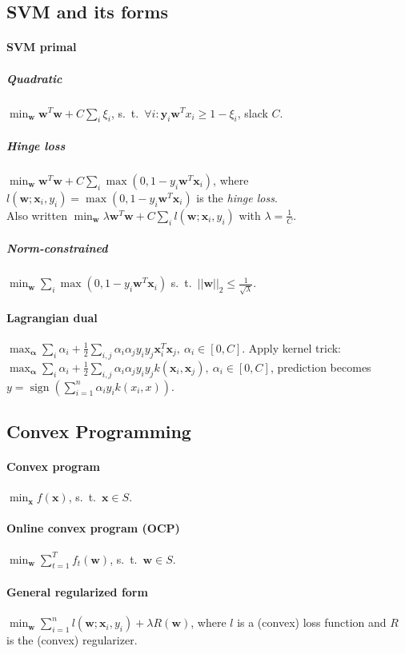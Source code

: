 \documentclass[a4paper, 9pt, DIV=24]{scrartcl}
\DeclareMathOperator{\sign}{sign}
\begin{document}
\begin{twocolumn}
\subsection{SVM and its forms}
\paragraph{SVM primal}
\subparagraph{Quadratic} $\min_{\bm w} \bm w^T \bm w + C\sum_{i}\xi_i$,
s.\ t.\ $\forall i: \bm y_i\bm w^T x_i \geq 1 - \xi_i$, slack $C$.
\subparagraph{Hinge loss} $\min_{\bm w} \bm w^T \bm w + C\sum_{i}\max(0,1-y_i\bm w^T\bm x_i)$,\newline
where $l(\bm w; \bm x_i, y_i) = \max(0,1-y_i\bm w^T \bm x_i)$ is the \emph{hinge loss}. \\
Also written $\min_{\bm w} \lambda \bm w^T \bm w + C\sum_{i}l(\bm w; \bm x_i, y_i)$ with $\lambda = \frac{1}{C}$.
\subparagraph{Norm-constrained}
$\min_{\bm w} \sum_{i}\max(0,1-y_i\bm w^T\bm x_i)$ s.\ t.\ $||\bm w||_2 \leq \frac{1}{\sqrt \lambda}$.
\paragraph{Lagrangian dual}
$\max_{\bm \alpha} \sum_{i}\alpha_i + \frac{1}{2}\sum_{i,j}\alpha_i\alpha_j y_i y_j \bm x_i^T\bm x_j,\ \alpha_i \in [0,C]$.
Apply kernel trick: 
$\max_{\bm \alpha} \sum_{i}\alpha_i + \frac{1}{2}\sum_{i,j}\alpha_i\alpha_j y_i y_j k(\bm x_i, \bm x_j),\ \alpha_i \in [0,C]$, prediction becomes $y = \sign(\sum_{i=1}^{n}\alpha_i y_i k(x_i,x))$.

\subsection{Convex Programming}
\paragraph{Convex program} $\min_{\bm x} f(\bm x)$, s.\ t.\ $\bm x \in S$.
\paragraph{Online convex program (OCP)} $\min_{\bm w} \sum_{t=1}^{T} f_t(\bm w)$, s.\ t.\ $\bm w \in S$.
\paragraph{General regularized form} $\min_{\bm w} \sum_{i=1}^{n} l(\bm w; \bm x_i, y_i) + \lambda R(\bm w)$, where $l$ is a (convex) loss function and $R$ is the (convex) regularizer.

\end{twocolumn}
\end{document}
